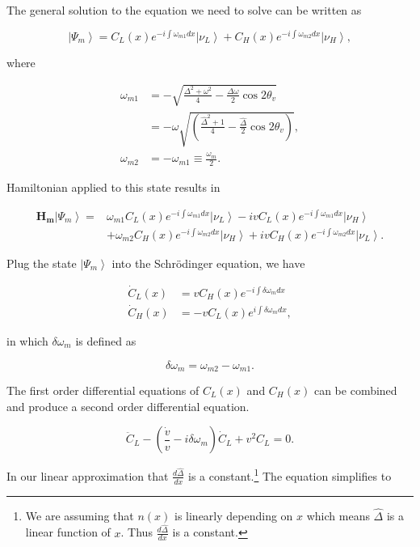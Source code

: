 \documentclass{tufte-handout}
\newcommand{\ket}[1]{\left| #1\right\rangle}
\begin{document}
The general solution to the equation we need to solve can be written as

\begin{equation*}
\ket{\Psi_m} = C_L(x) e^{-i\int \omega_{m1} dx} \ket{\nu_L} + C_H(x) e^{-i\int \omega_{m2} dx} \ket{\nu_H},
\end{equation*}

where

\begin{align*}
\omega_{m1} &=-\sqrt{ \frac{\Delta^2 + \omega^2}{4}-\frac{\Delta \omega}{2} \cos 2\theta_v } \\
& = -\omega \sqrt{\left( \frac{\hat\Delta^2 + 1}{4} - \frac{\hat\Delta}{2}\cos 2\theta_v \right)} , \\
\omega_{m2} & = - \omega_{m1} \equiv \frac{\omega_m}{2}.
\end{align*}

Hamiltonian applied to this state results in

\begin{align*}
\mathbf{H_m} \ket{\Psi_m} =& \omega_{m1} C_L(x) e^{-i\int \omega_{m1}dx} \ket{\nu_L} -ivC_L(x) e^{-i\int \omega_{m1}dx}\ket{\nu_H} \\ &+\omega_{m2}C_H(x) e^{-i\int \omega_{m2}dx}\ket{\nu_H} + iv C_H(x) e^{-i\int \omega_{m2}dx}\ket{\nu_L}.
\end{align*}

Plug the state $\ket{\Psi_m}$ into the Schrödinger equation, we have

\begin{align*}
\dot C_L(x) &= v C_H(x) e^{ - i\int \delta \omega_m dx} \\
\dot C_H(x) & = -v C_L(x) e^{i\int \delta\omega_m dx} ,
\end{align*}

in which $\delta\omega_m$ is defined as

\begin{equation*}
\delta \omega_m = \omega_{m2} - \omega_{m1}.
\end{equation*}


The first order differential equations of $C_L(x)$ and $C_H(x)$ can be combined and produce a second order differential equation.

\begin{equation*}
\ddot C_L - \left(  \frac{\dot v}{v} - i\delta \omega_m \right) \dot C_L + v^2 C_L = 0.
\end{equation*}

In our linear approximation that $\frac{d\hat\Delta}{dx}$ is a constant.\footnote{We are assuming that $n(x)$ is linearly depending on $x$ which means $\hat\Delta$ is a linear function of $x$. Thus $\frac{d\hat\Delta}{dx}$ is a constant.} The equation simplifies to
\end{document}
